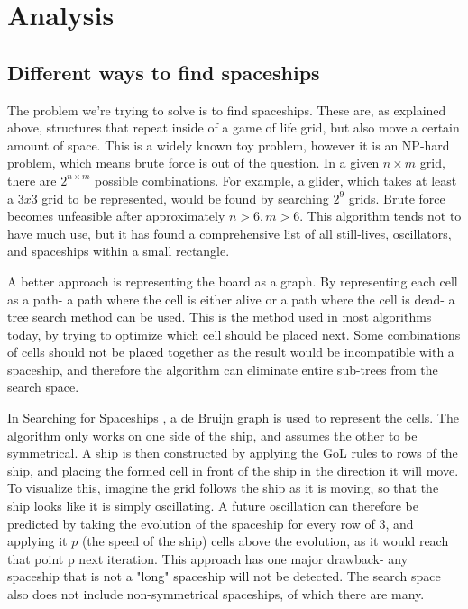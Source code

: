 \documentclass{l4proj}
\begin{document}

\chapter{Analysis}

\section{Different ways to find spaceships}

The problem we're trying to solve is to find spaceships. These are, as explained above, structures that repeat inside of a game of life grid, but also move a certain amount of space. This is a widely known toy problem, however it is an NP-hard problem, which means brute force is out of the question. In a given $n \times m$ grid, there are $2^{n \times m}$ possible combinations. For example, a glider, which takes at least a $3x3$ grid to be represented, would be found by searching $2^{9}$ grids. Brute force becomes unfeasible after approximately $n > 6, m > 6$. This algorithm tends not to have much use, but it has found a comprehensive list of all still-lives, oscillators, and spaceships within a small rectangle.

A better approach is representing the board as a graph. By representing each cell as a path- a path where the cell is either alive or a path where the cell is dead- a tree search method can be used. This is the method used in most algorithms today, by trying to optimize which cell should be placed next. Some combinations of cells should not be placed together as the result would be incompatible with a spaceship, and therefore the algorithm can eliminate entire sub-trees from the search space.

In Searching for Spaceships \cite{searching_for_spaceships}, a de Bruijn graph is used to represent the cells. The algorithm only works on one side of the ship, and assumes the other to be symmetrical. A ship is then constructed by applying the GoL rules to rows of the ship, and placing the formed cell in front of the ship in the direction it will move. To visualize this, imagine the grid follows the ship as it is moving, so that the ship looks like it is simply oscillating. A future oscillation can therefore be predicted by taking the evolution of the spaceship for every row of 3, and applying it $p$ (the speed of the ship) cells above the evolution, as it would reach that point p next iteration. This approach has one major drawback- any spaceship that is not a "long" spaceship will not be detected. The search space also does not include non-symmetrical spaceships, of which there are many.
\end{document}
